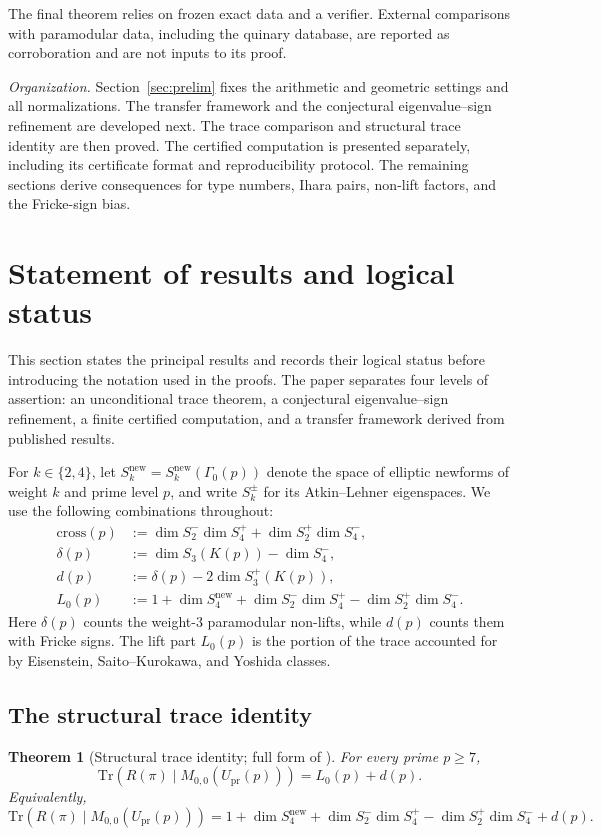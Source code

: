 \documentclass[10pt,a4paper]{amsart}
\newtheorem{theorem}{Theorem}[section]
\newcommand{\Tr}{\mathrm{Tr}}
\newcommand{\Upr}{U_{\mathrm{pr}}}
\newcommand{\snew}{S^{\mathrm{new}}}
\providecommand{\Upr}{U_{\mathrm{pr}}}
\providecommand{\snew}{S^{\mathrm{new}}}
\begin{document}
	The final theorem relies on frozen exact data and a verifier. External
	comparisons with paramodular data, including the quinary database, are
	reported as corroboration and are not inputs to its proof.
	
	\smallskip
	\noindent\emph{Organization.}
	Section~\ref{sec:prelim} fixes the arithmetic and geometric settings and
	all normalizations. The transfer framework and the conjectural
	eigenvalue--sign refinement are developed next. The trace comparison and
	structural trace identity are then proved. The certified computation is
	presented separately, including its certificate format and reproducibility
	protocol. The remaining sections derive consequences for type numbers,
	Ihara pairs, non-lift factors, and the Fricke-sign bias.
	
	\section{Statement of results and logical status}
	\label{sec:statements}
	
	This section states the principal results and records their logical status
	before introducing the notation used in the proofs. The paper separates
	four levels of assertion: an unconditional trace theorem, a conjectural
	eigenvalue--sign refinement, a finite certified computation, and a
	transfer framework derived from published results.
	
	For $k\in\{2,4\}$, let $\snew_k=\snew_k(\Gamma_0(p))$ denote the space of
	elliptic newforms of weight $k$ and prime level $p$, and write
	$S_k^{\pm}$ for its Atkin--Lehner eigenspaces. We use the following
	combinations throughout:
	\begin{align}
		\mathrm{cross}(p)
		&:=\dim S_2^-\dim S_4^+ + \dim S_2^+\dim S_4^-,
		\label{eq:cross-def}\\
		\delta(p)
		&:=\dim S_3(K(p))-\dim S_4^-,
		\label{eq:delta-def}\\
		d(p)
		&:=\delta(p)-2\dim S_3^+(K(p)),
		\label{eq:d-def}\\
		L_0(p)
		&:=1+\dim\snew_4+\dim S_2^-\dim S_4^+-\dim S_2^+\dim S_4^-.
		\label{eq:L0-def}
	\end{align}
	Here $\delta(p)$ counts the weight-$3$ paramodular non-lifts, while $d(p)$
	counts them with Fricke signs. The lift part $L_0(p)$ is the portion of the
	trace accounted for by Eisenstein, Saito--Kurokawa, and Yoshida classes.
	
	\subsection{The structural trace identity}
	\begin{theorem}[Structural trace identity; full form of ]\label{thm:structural-trace}
		For every prime $p\ge7$,
		\begin{equation}\label{eq:structural-trace}
			\Tr\!\left(R(\pi)\mid M_{0,0}(\Upr(p))\right)=L_0(p)+d(p).
		\end{equation}
		Equivalently,
		\[
		\Tr\!\left(R(\pi)\mid M_{0,0}(\Upr(p))\right)
		=
		1+\dim\snew_4
		+\dim S_2^-\dim S_4^+
		-\dim S_2^+\dim S_4^-
		+d(p).
		\]
	\end{theorem}
	
\end{document}
